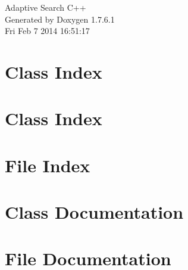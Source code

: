 \documentclass[a4paper]{book}
\begin{document}
\hypersetup{pageanchor=false,citecolor=blue}
\begin{titlepage}
\vspace*{7cm}
\begin{center}
{\Large \-Adaptive \-Search \-C++ }\\
\vspace*{1cm}
{\large \-Generated by Doxygen 1.7.6.1}\\
\vspace*{0.5cm}
{\small Fri Feb 7 2014 16:51:17}\\
\end{center}
\end{titlepage}
\clearemptydoublepage
{}
\tableofcontents
\clearemptydoublepage
{}
\hypersetup{pageanchor=true,citecolor=blue}
\chapter{\-Class \-Index}

\chapter{\-Class \-Index}

\chapter{\-File \-Index}

\chapter{\-Class \-Documentation}






















\chapter{\-File \-Documentation}
































\printindex
\end{document}
